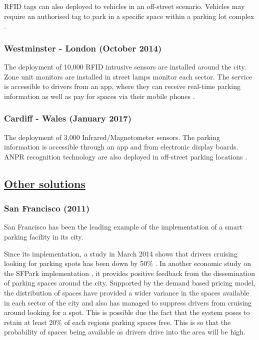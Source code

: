 \ac{RFID} tags can also deployed to vehicles in an off-street scenario. Vehicles may require an authorised tag to park in a specific space within a parking lot complex \citep{2017RFIDSmartParking}.

\subsubsection{Westminster - London (October 2014)}
The deployment of 10,000 RFID intrusive sensors are installed around the city. Zone unit monitors are installed in street lamps monitor each sector. The service is accessible to drivers from an app, where they can receive real-time parking information as well as pay for spaces via their mobile phones \citep{2017WestminsterSmartParking}.

\subsubsection{Cardiff - Wales (January 2017)}
The deployment of 3,000 Infrared/Magnetometer sensors. The parking information is accessible through an app and from electronic display boards. \ac{ANPR} recognition technology are also deployed in off-street parking locations \citep{2017CardiffSmartParking}.

\subsection*{\underline{Other solutions}}
\subsubsection{San Francisco (2011)}
San Francisco has been the leading example of the implementation of a smart parking facility in its city.

Since its implementation, a study in March 2014 shows that drivers cruising looking for parking spots has been down by 50\% \citep{Millard-Ball2014IsExperiment}. In another economic study on the SFPark implementation \citep{Shriver2016UnderstandingProject}, it provides positive feedback from the dissemination of parking spaces around the city. Supported by the demand based pricing model, the distribution of spaces have provided a wider variance in the spaces available in each sector of the city and also has managed to suppress drivers from cruising around looking for a spot. This is possible due the fact that the system poses to retain at least 20\% of each regions parking spaces free. This is so that the probability of spaces being available as drivers drive into the area will be high.